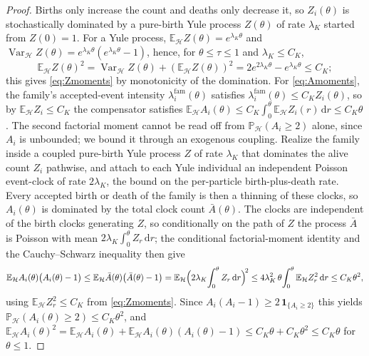\documentclass[a4paper,fleqn]{cas-sc}
\theoremstyle{definition}
\theoremstyle{remark}
\begin{document}
\begin{proof}
Births only increase the count and deaths only decrease it, so $Z_i(\theta)$ is
stochastically dominated by a pure-birth Yule process $Z(\theta)$ of rate
$\lambda_K$ started from $Z(0)=1$. For a Yule process,
$\mathbb E_{\mathcal H}Z(\theta)=e^{\lambda_K\theta}$ and
$\operatorname{Var}_{\mathcal H}Z(\theta)=e^{\lambda_K\theta}(e^{\lambda_K\theta}-1)$,
hence, for $\theta\le\tau\le1$ and $\lambda_K\le C_K$,
\[
\mathbb E_{\mathcal H}Z(\theta)^2
=\operatorname{Var}_{\mathcal H}Z(\theta)+(\mathbb E_{\mathcal H}Z(\theta))^2
=2e^{2\lambda_K\theta}-e^{\lambda_K\theta}\le C_K;
\]
this gives \eqref{eq:Zmoments} by monotonicity of the domination. For \eqref{eq:Amoments}, the
family's accepted-event intensity $\lambda^{\mathrm{fam}}_i(\theta)$ satisfies
$\lambda^{\mathrm{fam}}_i(\theta)\le C_K Z_i(\theta)$, so by
$\mathbb E_{\mathcal H}Z_i\le C_K$ the compensator satisfies
$\mathbb E_{\mathcal H}A_i(\theta)\le C_K\int_0^\theta\mathbb E_{\mathcal H}Z_i(r)\,\mathrm dr\le C_K\theta$.
The second factorial moment cannot be read off from $\mathbb P_{\mathcal H}(A_i\ge2)$ alone, since
$A_i$ is unbounded; we bound it through an exogenous coupling. Realize the family inside a coupled
pure-birth Yule process $Z$ of rate $\lambda_K$ that dominates the alive count $Z_i$ pathwise, and
attach to each Yule individual an independent Poisson event-clock of rate $2\lambda_K$, the bound on
the per-particle birth-plus-death rate. Every accepted birth or death of the family is then a thinning
of these clocks, so $A_i(\theta)$ is dominated by the total clock count $\bar A(\theta)$. The clocks
are independent of the birth clocks generating $Z$, so conditionally on the path of $Z$ the process
$\bar A$ is Poisson with mean $2\lambda_K\int_0^\theta Z_r\,\mathrm dr$; the conditional
factorial-moment identity and the Cauchy--Schwarz inequality then give
\[
\mathbb E_{\mathcal H}A_i(\theta)\bigl(A_i(\theta)-1\bigr)
\le\mathbb E_{\mathcal H}\bar A(\theta)\bigl(\bar A(\theta)-1\bigr)
=\mathbb E_{\mathcal H}\Bigl(2\lambda_K\!\int_0^\theta Z_r\,\mathrm dr\Bigr)^{\!2}
\le 4\lambda_K^2\,\theta\!\int_0^\theta\mathbb E_{\mathcal H}Z_r^2\,\mathrm dr
\le C_K\theta^2,
\]
using $\mathbb E_{\mathcal H}Z_r^2\le C_K$ from \eqref{eq:Zmoments}. Since
$A_i(A_i-1)\ge2\,\mathbf 1_{\{A_i\ge2\}}$ this yields $\mathbb P_{\mathcal H}(A_i(\theta)\ge2)\le C_K\theta^2$,
and $\mathbb E_{\mathcal H}A_i(\theta)^2=\mathbb E_{\mathcal H}A_i(\theta)+\mathbb E_{\mathcal H}A_i(\theta)(A_i(\theta)-1)
\le C_K\theta+C_K\theta^2\le C_K\theta$ for $\theta\le1$.
\end{proof}
\end{document}
